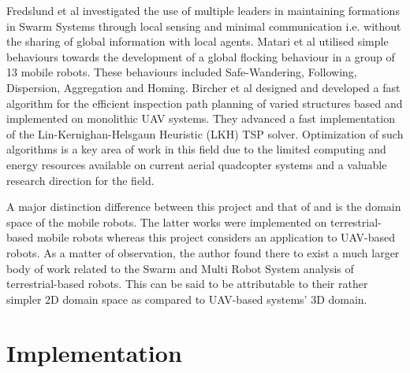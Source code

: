 \documentclass{report}
\begin{document}
Fredslund et al \cite{Fredslund2002} investigated the use of multiple leaders in maintaining formations in Swarm Systems through local sensing and minimal communication i.e. without the sharing of global information with local agents. Matari et al \cite{Matari1995} utilised simple behaviours towards the development of a global flocking behaviour in a group of 13 mobile robots. These behaviours included Safe-Wandering, Following, Dispersion, Aggregation and Homing. Bircher et al \cite{Bircher2015} designed and developed a fast algorithm for the efficient inspection path planning of varied structures based and implemented on monolithic UAV systems. They advanced a fast implementation of the Lin-Kernighan-Helsgaun Heuristic (LKH) TSP solver. Optimization of such algorithms is a key area of work in this field due to the limited computing and energy resources available on current aerial quadcopter systems and a valuable research direction for the field.

A major distinction difference between this project and that of \cite{Matari1995} and \cite{Fredslund2002} is the domain space of the mobile robots. The latter works were implemented on terrestrial-based mobile robots whereas this project considers an application to UAV-based robots. As a matter of observation, the author found there to exist a much larger body of work related to the Swarm and Multi Robot System analysis of terrestrial-based robots. This can be said to be attributable to their rather simpler 2D domain space as compared to UAV-based systems' 3D domain.

\chapter{Implementation} \label{implementation}
\end{document}
